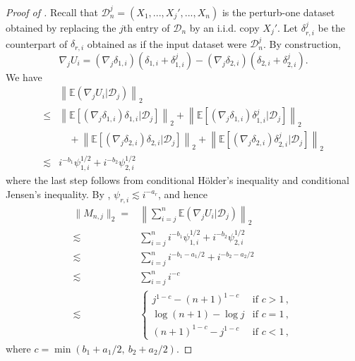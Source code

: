 \documentclass[11pt]{article}
\theoremstyle{plain}
\newcommand{\D}{{\mathcal{D}}}
\begin{document}
\begin{proof}[Proof of ]
Recall that $\D_n^j=(X_1,...,X_j',...,X_n)$ is the perturb-one dataset obtained by replacing the $j$th entry of $\D_n$ by an i.i.d. copy $X_j'$.  Let $\delta_{r,i}^j$ be the counterpart of $\delta_{r,i}$ obtained as if the input dataset were $\D_n^j$.
By construction, 
$$\nabla_j U_i = (\nabla_j \delta_{1,i})(\delta_{1,i}+\delta_{1,i}^j)-(\nabla_j \delta_{2,i})(\delta_{2,i}+\delta_{2,i}^j).$$
We have
\begin{align*}
    &\left\|\mathbb E(\nabla_j U_i|\D_j)\right\|_2\\
    \le& \left\|\mathbb E\left[(\nabla_j \delta_{1,i})\delta_{1,i}\big|\D_j\right]\right\|_2+ \left\|\mathbb E\left[(\nabla_j \delta_{1,i})\delta_{1,i}^j\Big|\D_j\right]\right\|_2\\
    &\quad+\left\|\mathbb E\left[(\nabla_j \delta_{2,i})\delta_{2,i}\big|\D_j\right]\right\|_2+ \left\|\mathbb E\left[(\nabla_j \delta_{2,i})\delta_{2,i}^j\Big|\D_j\right]\right\|_2\\
    \lesssim & i^{-b_1}\psi_{1,i}^{1/2}+i^{-b_2}\psi_{2,i}^{1/2}
\end{align*}
where the last step follows from conditional H\"{o}lder's inequality and conditional Jensen's inequality.
By , $\psi_{r,i}\lesssim i^{-a_r}$, and hence
\begin{align*}
    \|M_{n,j}\|_2 = & \left\|\sum_{i=j}^n \mathbb E(\nabla_j U_i|\D_{j})\right\|_2\\
    \lesssim &\sum_{i=j}^n i^{-b_1}\psi_{1,i}^{1/2}+i^{-b_2}\psi_{2,i}^{1/2}\\
    \lesssim& \sum_{i=j}^n i^{-b_1-a_1/2} + i^{-b_2-a_2/2}\\
    \lesssim&\sum_{i=j}^n i^{-c}\\
    \lesssim&\left\{\begin{array}{ll}
        j^{1-c}-(n+1)^{1-c} & \text{if }c>1\,, \\
        \log (n+1)-\log j & \text{if } c=1\,,\\
        (n+1)^{1-c}-j^{1-c} & \text{if }c<1\,,
    \end{array}\right.
\end{align*}
where $c=\min(b_1+a_1/2,~b_2+a_2/2)$.


\end{proof}
\end{document}
